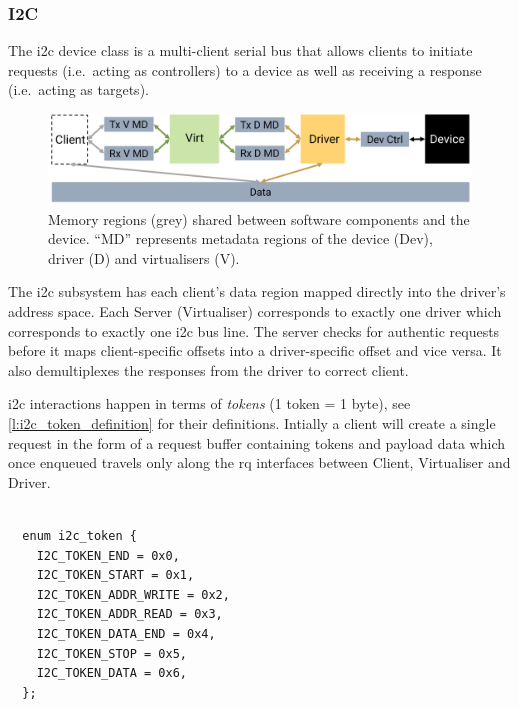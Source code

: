 \documentclass[a4paper,12pt]{report}
\newcommand{\figscale}{0.2}
\begin{document}
\subsubsection{I2C}\label{s:cl-i2c}

The \gls{i2c} device class is a multi-client serial bus that allows
clients to initiate
requests (i.e.\ acting as controllers) to a device as well as receiving a response (i.e.\
acting as targets).

\begin{figure}[th]
  \centering
  \includegraphics[scale=\figscale]{i2c}
  \caption[Memory regions shared between software components
    and the device.]{Memory regions (grey) shared between software components
    and the device. ``MD'' represents metadata regions of the device
    (Dev), driver (D) and virtualisers (V).}
  \label{f:i2c_diagram}
\end{figure}

The \gls{i2c} subsystem has each client's data region mapped directly into the driver's address space.
Each Server (Virtualiser) corresponds to exactly one driver which corresponds to exactly one \gls{i2c} bus line.
The server checks for authentic requests before it maps client-specific offsets into a driver-specific offset and vice versa.
It also demultiplexes the responses from the driver to correct client.

\gls{i2c} interactions happen in terms of \emph{tokens} (1 token = 1 byte), see
\autoref{l:i2c_token_definition} for their definitions.
Intially a client will create a single request in the form of a request buffer containing tokens
and payload data which once enqueued travels only along the \gls{rq} interfaces between Client, Virtualiser and Driver.

\begin{lstlisting}[gobble=2,firstline=2,float=th,
  label={l:i2c_token_definition},
  caption={I2C token definitions.}]

  enum i2c_token {
    I2C_TOKEN_END = 0x0,
    I2C_TOKEN_START = 0x1,
    I2C_TOKEN_ADDR_WRITE = 0x2,
    I2C_TOKEN_ADDR_READ = 0x3,
    I2C_TOKEN_DATA_END = 0x4,
    I2C_TOKEN_STOP = 0x5,
    I2C_TOKEN_DATA = 0x6,
  };
\end{lstlisting}
\end{document}
